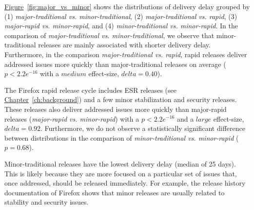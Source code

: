 \begin{sloppypar}
\noindent{}
\hyperref[fig:major_vs_minor]{Figure}~\ref{fig:major_vs_minor} shows the distributions of delivery delay
grouped by (1) \textit{major-traditional vs. minor-traditional}, (2)
\textit{major-traditional vs. rapid}, (3) \textit{major-rapid vs. minor-rapid},
and (4) \textit{minor-traditional vs. minor-rapid}. In the comparison of
\textit{major-traditional vs.  minor-traditional}, we observe that
minor-traditional releases are mainly associated with shorter delivery delay.
Furthermore, in the comparison \textit{major-traditional vs. rapid}, rapid
releases deliver addressed issues more quickly than major-traditional releases
on average ($p<2.2e^{-16}$ with a $medium$ effect-size, \ie  $delta=0.40$). 
\end{sloppypar}

The Firefox rapid release cycle includes ESR releases (see
\hyperref[ch:background]{Chapter}~\ref{ch:background}) and a few minor
stabilization and security releases. These releases also deliver addressed
issues more quickly than major-rapid releases (\textit{major-rapid vs.
minor-rapid}) with a $p<2.2e^{-16}$ and a $large$ effect-size, \ie $delta=0.92$.
Furthermore, we do not observe a statistically significant difference between
distributions in the comparison of \textit{minor-traditional vs. minor-rapid}
($p=0.68$).

Minor-traditional releases have the lowest delivery delay (median of 25
days). This is likely because they are more focused on a particular set of
issues that, once addressed, should be released immediately. For example, the
release history documentation of Firefox shows that minor releases are usually
related to stability and security
issues.\\

